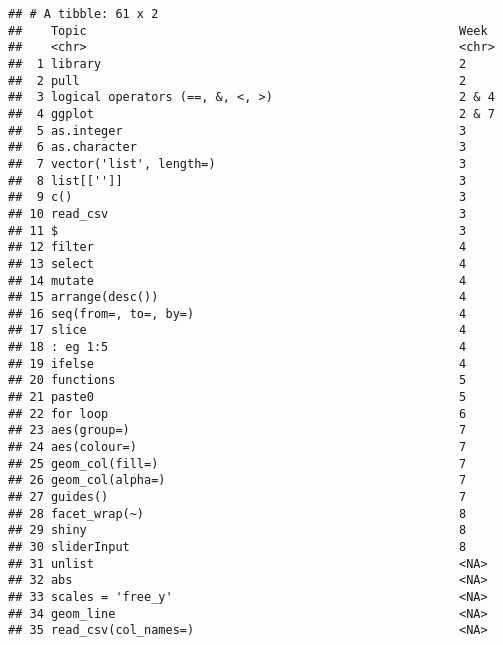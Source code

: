 \documentclass[
]{article}
\begin{document}
\begin{verbatim}
## # A tibble: 61 x 2
##    Topic                                                    Week 
##    <chr>                                                    <chr>
##  1 library                                                  2    
##  2 pull                                                     2    
##  3 logical operators (==, &, <, >)                          2 & 4
##  4 ggplot                                                   2 & 7
##  5 as.integer                                               3    
##  6 as.character                                             3    
##  7 vector('list', length=)                                  3    
##  8 list[['']]                                               3    
##  9 c()                                                      3    
## 10 read_csv                                                 3    
## 11 $                                                        3    
## 12 filter                                                   4    
## 13 select                                                   4    
## 14 mutate                                                   4    
## 15 arrange(desc())                                          4    
## 16 seq(from=, to=, by=)                                     4    
## 17 slice                                                    4    
## 18 : eg 1:5                                                 4    
## 19 ifelse                                                   4    
## 20 functions                                                5    
## 21 paste0                                                   5    
## 22 for loop                                                 6    
## 23 aes(group=)                                              7    
## 24 aes(colour=)                                             7    
## 25 geom_col(fill=)                                          7    
## 26 geom_col(alpha=)                                         7    
## 27 guides()                                                 7    
## 28 facet_wrap(~)                                            8    
## 29 shiny                                                    8    
## 30 sliderInput                                              8    
## 31 unlist                                                   <NA> 
## 32 abs                                                      <NA> 
## 33 scales = 'free_y'                                        <NA> 
## 34 geom_line                                                <NA> 
## 35 read_csv(col_names=)                                     <NA> 

\end{verbatim}
\end{document}
